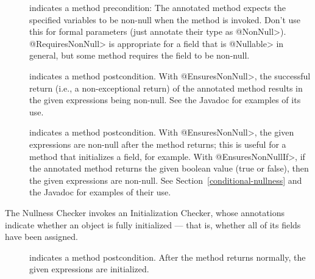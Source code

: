 \begin{description}

\item[]
  indicates a method precondition:  The annotated method expects the
  specified variables to be non-null when the
  method is invoked.  Don't use this for formal parameters (just annotate
  their type as \<@NonNull>).  \<@RequiresNonNull> is appropriate for
  a field that is \<@Nullable> in general, but some method requires the
  field to be non-null.

\item[]
  indicates a method postcondition.
  With \<@EnsuresNonNull>, the successful return (i.e., a non-exceptional
  return) of the annotated method results in the given expressions being
  non-null. See the Javadoc for examples of its use.
\item[]
  indicates a method postcondition.  With \<@EnsuresNonNull>, the given
  expressions are non-null after the method returns; this is useful for a
  method that initializes a field, for example.  With
  \<@EnsuresNonNullIf>, if the annotated
  method returns the given boolean value (true or false), then the given
  expressions are non-null.  See Section~\ref{conditional-nullness} and the
  Javadoc for examples of their use.

\end{description}



The Nullness Checker invokes an Initialization Checker, whose annotations indicate whether
an object is fully initialized --- that is, whether all of its fields have
been assigned.

\begin{description}
\item[]
\item[]
\item[]
\item[]
\item[]
  indicates a method postcondition.  After the method returns normally, the given
  expressions are initialized.
\end{description}

